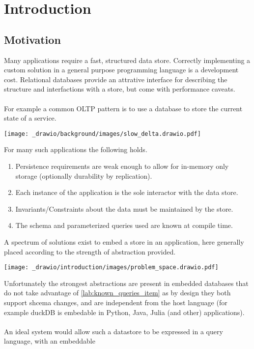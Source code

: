 \chapter{Introduction}
\section{Motivation}
Many applications require a fast, structured data store. Correctly implementing
a custom solution in a general purpose programming language is a development cost.
Relational databases provide an attrative interface for describing the structure
and interfactions with a store, but come with performance caveats.
\\
\\ For example a common OLTP pattern is to use a database to store the current state of a service.
\begin{center}
    \texttt{[image: \_drawio/background/images/slow\_delta.drawio.pdf]}
\end{center}
\vspace{-1cm}
\noindent For many such applications the following holds.
\begin{enumerate}
    \setlength\itemsep{0em}
    \item Persistence requirements are weak enough to allow for in-memory only storage (optionally durability by replication).
    \item Each instance of the application is the sole interactor with the data store.
    \item Invariants/Constraints about the data must be maintained by the store.
    \item The schema and parameterized queries used are known at compile time. \label{lab:known_queries_item}
\end{enumerate}
A spectrum of solutions exist to embed a store in an application, here generally placed according to the strength of abstraction provided.
\begin{center}
    \texttt{[image: \_drawio/introduction/images/problem\_space.drawio.pdf]}
\end{center}
Unfortunately the strongest abstractions are present in embedded databases that do not take advantage of \ref{lab:known_queries_item} as by design they both support shcema changes, and are independent from the host language (for example duckDB is embedable in Python, Java, Julia (and other) applications).
\\
\\
An ideal system would allow such a datastore to be expressed in a query language, with an embeddable
